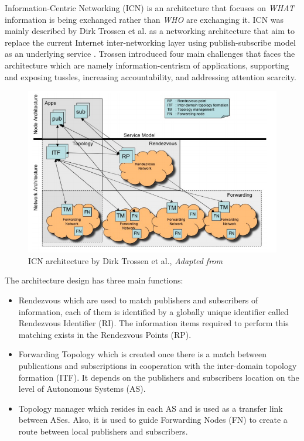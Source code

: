 Information-Centric Networking (ICN) is an architecture that focuses on \textit{WHAT} information is being exchanged rather than \textit{WHO} are exchanging it. ICN was mainly described by Dirk Trossen et al. as a networking architecture that aim to replace the current Internet inter-networking layer using publish-subscribe model as an underlying service \cite{Trossen:2010:AII:1764873.1764878}. Trossen introduced four main challenges that faces the architecture which are namely information-centrism of applications, supporting and exposing tussles, increasing accountability, and addressing attention scarcity.
\begin{figure}[H]
	\centering
	\includegraphics[scale=0.4]{images/trossen.png}
	\caption{ICN architecture by Dirk Trossen et al., \textit{Adapted from } \cite{Trossen:2010:AII:1764873.1764878} }
	\label{fig:trossen}
\end{figure}

\noindent The architecture  design has three main functions:
\begin{itemize}
\item Rendezvous which are used to match  publishers and subscribers of information, each of them is identified by a globally unique identifier called Rendezvous Identifier (RI). The information items required to perform this matching exists in the Rendezvous Points (RP).
\item Forwarding Topology which is created once there is a match between publications and subscriptions in cooperation with the inter-domain topology formation (ITF). It depends on the publishers and subscribers location on the level of Autonomous Systems (AS).
\item Topology manager which resides in each AS and is used as a transfer link between ASes. Also, it is used to guide Forwarding Nodes (FN) to create a route between local publishers and subscribers.
\end{itemize}


